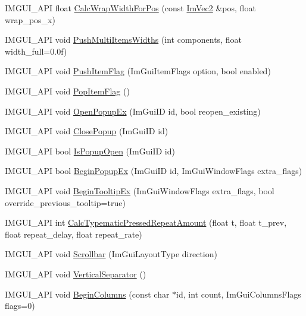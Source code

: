 \begin{DoxyCompactItemize}
\item 
I\+M\+G\+U\+I\+\_\+\+A\+PI float \hyperlink{namespace_im_gui_a66416151e58c34cd02973976de66e0e9}{Calc\+Wrap\+Width\+For\+Pos} (const \hyperlink{struct_im_vec2}{Im\+Vec2} \&pos, float wrap\+\_\+pos\+\_\+x)
\item 
I\+M\+G\+U\+I\+\_\+\+A\+PI void \hyperlink{namespace_im_gui_ab913605fcf6d405d102cdf56cd414a5a}{Push\+Multi\+Items\+Widths} (int components, float width\+\_\+full=0.\+0f)
\item 
I\+M\+G\+U\+I\+\_\+\+A\+PI void \hyperlink{namespace_im_gui_ac7301f6378333f6d17f47823eed9e00a}{Push\+Item\+Flag} (Im\+Gui\+Item\+Flags option, bool enabled)
\item 
I\+M\+G\+U\+I\+\_\+\+A\+PI void \hyperlink{namespace_im_gui_aa93281155e1dd23715dbd384e91edc6b}{Pop\+Item\+Flag} ()
\item 
I\+M\+G\+U\+I\+\_\+\+A\+PI void \hyperlink{namespace_im_gui_a92683a696319581577334d6b798e2f97}{Open\+Popup\+Ex} (Im\+Gui\+ID id, bool reopen\+\_\+existing)
\item 
I\+M\+G\+U\+I\+\_\+\+A\+PI void \hyperlink{namespace_im_gui_a7f3f82fc44d67af554faf104b913ea55}{Close\+Popup} (Im\+Gui\+ID id)
\item 
I\+M\+G\+U\+I\+\_\+\+A\+PI bool \hyperlink{namespace_im_gui_ae747d8e0c6ff9c24535e9d07e9350397}{Is\+Popup\+Open} (Im\+Gui\+ID id)
\item 
I\+M\+G\+U\+I\+\_\+\+A\+PI bool \hyperlink{namespace_im_gui_a89da3a22300e8293257b6cfdf1b83b7a}{Begin\+Popup\+Ex} (Im\+Gui\+ID id, Im\+Gui\+Window\+Flags extra\+\_\+flags)
\item 
I\+M\+G\+U\+I\+\_\+\+A\+PI void \hyperlink{namespace_im_gui_a3189530b7795a9b99169eb95f36c516d}{Begin\+Tooltip\+Ex} (Im\+Gui\+Window\+Flags extra\+\_\+flags, bool override\+\_\+previous\+\_\+tooltip=true)
\item 
I\+M\+G\+U\+I\+\_\+\+A\+PI int \hyperlink{namespace_im_gui_ad3af0fc327467a44116d7d04018b9124}{Calc\+Typematic\+Pressed\+Repeat\+Amount} (float t, float t\+\_\+prev, float repeat\+\_\+delay, float repeat\+\_\+rate)
\item 
I\+M\+G\+U\+I\+\_\+\+A\+PI void \hyperlink{namespace_im_gui_abf1d7a83c5f0a555bbe7f831b0319c8a}{Scrollbar} (Im\+Gui\+Layout\+Type direction)
\item 
I\+M\+G\+U\+I\+\_\+\+A\+PI void \hyperlink{namespace_im_gui_ae60f7b8ece8808c477796e6594c8d796}{Vertical\+Separator} ()
\item 
I\+M\+G\+U\+I\+\_\+\+A\+PI void \hyperlink{namespace_im_gui_a4b0c247a5d091c5921c58de6bc8215aa}{Begin\+Columns} (const char $\ast$id, int count, Im\+Gui\+Columns\+Flags flags=0)

\end{DoxyCompactItemize}
